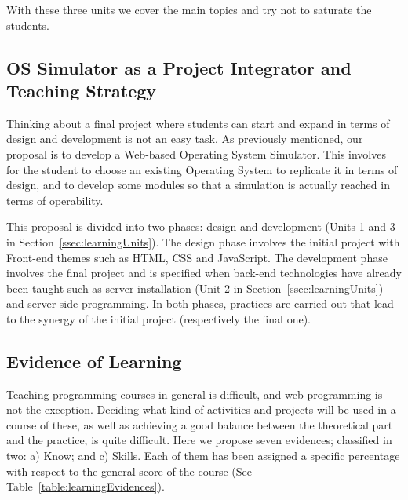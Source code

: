 With these three units we cover the main topics and try not to saturate the students.

\subsection{OS Simulator as a Project Integrator and Teaching Strategy}
\label{ssec:projectIntegrator}

Thinking about a final project where students can start and expand in terms of design 
and development is not an easy task. As previously mentioned, our proposal is to 
develop a Web-based Operating System Simulator. This involves for 
the student to choose an existing Operating System to replicate it in terms of design, 
and to develop some modules so that a simulation is actually reached in terms of 
operability. 

This proposal is divided into two phases: design and development (Units 1 and 3 in 
Section~\ref{ssec:learningUnits}). 
The design phase involves the initial project with Front-end themes such as HTML, 
CSS and JavaScript. 
The development phase involves the final project and is specified when back-end 
technologies have already been taught such as server installation (Unit 2 in 
Section~\ref{ssec:learningUnits}) and server-side programming. 
In both phases, practices are carried out that lead to the synergy of the initial 
project (respectively the final one).

\subsection{Evidence of Learning}
Teaching programming courses in general is difficult, and web programming is not the 
exception. Deciding what kind of activities and projects will be used in a course of 
these, as well as achieving a good balance between the theoretical part and the 
practice, is quite difficult. Here we propose seven evidences; classified in two: 
a) Know; and 
c) Skills. 
Each of them has been assigned a specific percentage with respect to the 
general score of the course (See Table~\ref{table:learningEvidences}).

